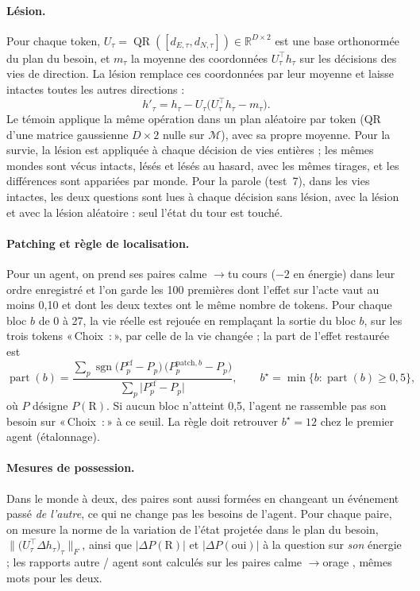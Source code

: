 \documentclass[11pt,a4paper]{article}
\newcommand{\Choix}{«\,Choix~:\,»}
\begin{document}
\paragraph{Lésion.} Pour chaque token, $U_\tau=\operatorname{QR}([d_{E,\tau},d_{N,\tau}])
\in\mathbb R^{D\times 2}$ est une base orthonormée du plan du besoin, et $m_\tau$
la moyenne des coordonnées $U_\tau^\top h_\tau$ sur les décisions des vies de
direction. La lésion remplace ces coordonnées par leur moyenne et laisse intactes
toutes les autres directions :
\begin{equation}
h'_\tau = h_\tau - U_\tau\bigl(U_\tau^{\top}h_\tau - m_\tau\bigr).
\label{eq-lesion}
\end{equation}
Le témoin applique la même opération dans un plan aléatoire par token (QR d'une
matrice gaussienne $D\times2$ nulle sur $\mathcal M$), avec sa propre moyenne. Pour
la survie, la lésion est appliquée à chaque décision de vies entières ; les mêmes
mondes sont vécus intacts, lésés et lésés au hasard, avec les mêmes tirages, et
les différences sont appariées par monde. Pour la parole (test~7), dans les vies
intactes, les deux questions sont lues à chaque décision sans lésion, avec la
lésion et avec la lésion aléatoire : seul l'état du tour est touché.

\paragraph{Patching et règle de localisation.} Pour un agent, on prend ses paires
\og calme \fg{}$\to$\og tu cours \fg{} ($-2$ en énergie) dans leur ordre enregistré
et l'on garde les 100 premières dont l'effet sur l'acte vaut au moins 0,10 et
dont les deux textes ont le même nombre de tokens. Pour chaque bloc $b$ de 0 à 27,
la vie réelle est rejouée en remplaçant la sortie du bloc $b$, sur les trois tokens
\Choix{}, par celle de la vie changée ; la part de l'effet restaurée est
\begin{equation}
\operatorname{part}(b)=\frac{\sum_{p}\operatorname{sgn}\bigl(P^{\text{cf}}_p-P_p\bigr)\,
\bigl(P^{\text{patch},b}_p-P_p\bigr)}{\sum_p\bigl|P^{\text{cf}}_p-P_p\bigr|},
\qquad b^\star=\min\{b : \operatorname{part}(b)\ge 0,5\},
\label{eq-share}
\end{equation}
où $P$ désigne $P(\mathrm R)$. Si aucun bloc n'atteint 0,5, l'agent ne rassemble
pas son besoin sur \Choix{} à ce seuil. La règle doit retrouver $b^\star=12$ chez
le premier agent (étalonnage).

\paragraph{Mesures de possession.} Dans le monde à deux, des paires sont aussi
formées en changeant un événement passé \emph{de l'autre}, ce qui ne change pas
les besoins de l'agent. Pour chaque paire, on mesure la norme de la variation de
l'état projetée dans le plan du besoin,
$\bigl\lVert\bigl(U_\tau^\top\Delta h_\tau\bigr)_{\tau}\bigr\rVert_F$, ainsi que
$|\Delta P(\mathrm R)|$ et $|\Delta P(\text{oui})|$ à la question sur \emph{son}
énergie ; les rapports \og autre / agent \fg{} sont calculés sur les paires
\og calme \fg{}$\to$\og orage \fg{}, mêmes mots pour les deux.
\end{document}
